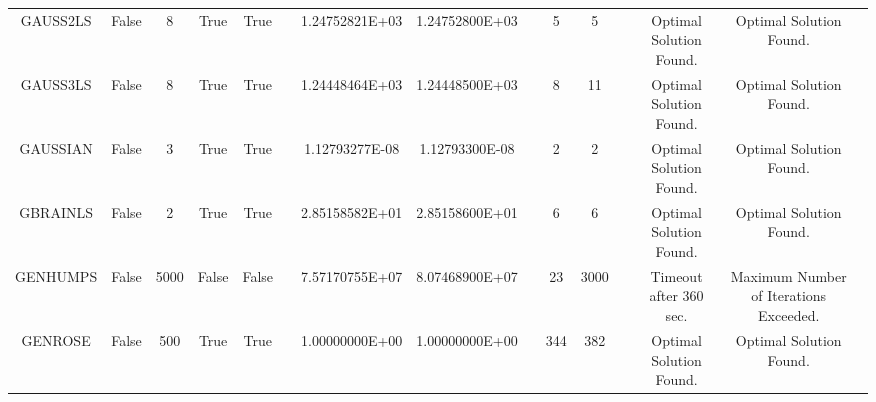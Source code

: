 \begin{longtable}{ccccccccccccccc}
	\cellcolor{default2} GAUSS2LS& \cellcolor{default2} False& \cellcolor{default2} 8& \cellcolor{default2} True& \cellcolor{default2} True& \cellcolor{header} & \cellcolor{ok} 1.24752821E+03& \cellcolor{best} 1.24752800E+03& \cellcolor{header} & \cellcolor{best} 5& \cellcolor{best} 5& \cellcolor{header} & \cellcolor{default2} Optimal Solution Found.& \cellcolor{default2} Optimal Solution Found.& \cellcolor{header} \\
	\cellcolor{default1} GAUSS3LS& \cellcolor{default1} False& \cellcolor{default1} 8& \cellcolor{default1} True& \cellcolor{default1} True& \cellcolor{header} & \cellcolor{best} 1.24448464E+03& \cellcolor{ok} 1.24448500E+03& \cellcolor{header} & \cellcolor{best} 8& \cellcolor{ok} 11& \cellcolor{header} & \cellcolor{default1} Optimal Solution Found.& \cellcolor{default1} Optimal Solution Found.& \cellcolor{header} \\
	\cellcolor{default2} GAUSSIAN& \cellcolor{default2} False& \cellcolor{default2} 3& \cellcolor{default2} True& \cellcolor{default2} True& \cellcolor{header} & \cellcolor{best} 1.12793277E-08& \cellcolor{ok} 1.12793300E-08& \cellcolor{header} & \cellcolor{best} 2& \cellcolor{best} 2& \cellcolor{header} & \cellcolor{default2} Optimal Solution Found.& \cellcolor{default2} Optimal Solution Found.& \cellcolor{header} \\
	\cellcolor{default1} GBRAINLS& \cellcolor{default1} False& \cellcolor{default1} 2& \cellcolor{default1} True& \cellcolor{default1} True& \cellcolor{header} & \cellcolor{best} 2.85158582E+01& \cellcolor{ok} 2.85158600E+01& \cellcolor{header} & \cellcolor{best} 6& \cellcolor{best} 6& \cellcolor{header} & \cellcolor{default1} Optimal Solution Found.& \cellcolor{default1} Optimal Solution Found.& \cellcolor{header} \\
	\cellcolor{default2} GENHUMPS& \cellcolor{default2} False& \cellcolor{default2} 5000& \cellcolor{default2} False& \cellcolor{default2} False& \cellcolor{header} & \cellcolor{best} 7.57170755E+07& \cellcolor{poor} 8.07468900E+07& \cellcolor{header} & \cellcolor{best} 23& \cellcolor{poor} 3000& \cellcolor{header} & \cellcolor{default2} Timeout after 360 sec.& \cellcolor{default2} Maximum Number of Iterations Exceeded.& \cellcolor{header} \\
	\cellcolor{default1} GENROSE& \cellcolor{default1} False& \cellcolor{default1} 500& \cellcolor{default1} True& \cellcolor{default1} True& \cellcolor{header} & \cellcolor{best} 1.00000000E+00& \cellcolor{best} 1.00000000E+00& \cellcolor{header} & \cellcolor{best} 344& \cellcolor{ok} 382& \cellcolor{header} & \cellcolor{default1} Optimal Solution Found.& \cellcolor{default1} Optimal Solution Found.& \cellcolor{header} \\

\end{longtable}
